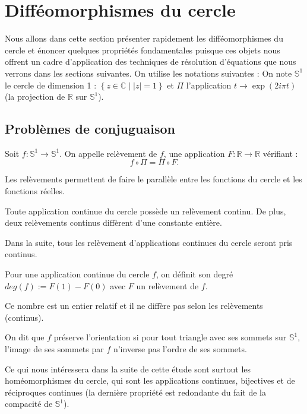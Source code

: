 \documentclass[11pt,a4paper]{article}
\begin{document}
\section{Difféomorphismes du cercle}
Nous allons dans cette section présenter rapidement les difféomorphismes du cercle et énoncer quelques propriétés fondamentales puisque ces objets nous offrent un cadre d'application des techniques de résolution d'équations que nous verrons dans les sections suivantes. On utilise les notations suivantes :
On note $\mathbb{S}^1$ le cercle de dimension 1 : $\left\{ z \in \mathbb{C} \mid |z|=1 \right\}$ et  $\Pi$ l'application $ t \to \exp (2i\pi t) $ (la projection de $\mathbb{R}$ sur $\mathbb{S}^1$).
\subsection{Problèmes de conjuguaison}
\begin{defin}
Soit $f :\mathbb{S}^1 \to \mathbb{S}^1$. On appelle relèvement de $f$, une application $F :  \mathbb{R} \to \mathbb{R}$ vérifiant :
\begin{equation*}
f \circ \Pi = \Pi \circ F.
\end{equation*}
\end{defin}
\begin{rmq}
Les relèvements permettent de faire le parallèle entre les fonctions du cercle et les fonctions réelles.
\end{rmq}
\begin{thm}
Toute application continue du cercle possède un relèvement continu. De plus, deux relèvements continus diffèrent d'une constante entière.
\end{thm}
Dans la suite, tous les relèvement d'applications continues du cercle seront pris continus.
\begin{defin}
Pour une application continue du cercle $f$, on définit son degré $deg(f) := F(1)-F(0)$ avec $F$ un relèvement de $f$.
\end{defin}
\begin{rmq}
Ce nombre est un entier relatif et il ne diffère pas selon les relèvements (continus).
\end{rmq}
\begin{defin}
On dit que $f$ préserve l'orientation si pour tout triangle avec ses sommets sur $\mathbb{S}^1$, l'image de ses sommets par $f$ n'inverse pas l'ordre de ses sommets.
\end{defin}
Ce qui nous intéressera dans la suite de cette étude sont surtout les homéomorphismes du cercle, qui sont les applications continues, bijectives et de réciproques continues (la dernière propriété est redondante du fait de la compacité de $\mathbb{S}^1$).
\end{document}
